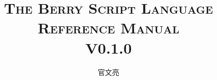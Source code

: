
\newcommand\nbvspace[1][3]{\vspace*{\stretch{#1}}}
\newcommand\nbstretchyspace{\spaceskip0.5em plus 0.25em minus 0.25em}
\newcommand{\nbtitlestretch}{\spaceskip0.6em}

\newcommand{\cndash}{\raisebox{0.5mm}{------}}

\begin{titlepage}

    \title{\ebgaramond\Huge{\scshape The Berry Script Language\\Reference Manual}\\\Large{V0.1.0}}

    \author{官文亮}

    \maketitle

\end{titlepage}
